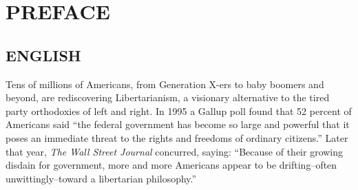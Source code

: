 \chapter*{PREFACE}
\section*{ENGLISH}
Tens of millions of Americans, from Generation X-ers to baby boomers and beyond, are rediscovering Libertarianism, a visionary alternative to the
tired party orthodoxies of left and right. In 1995 a Gallup poll found that 52 percent of Americans said ``the federal government has become so large and powerful that it poses an immediate threat to the rights and freedoms of ordinary citizens.'' Later that year, \textit{The Wall Street Journal} concurred, saying: ``Because of their growing disdain for government, more and more Americans appear to be drifting--often unwittingly--toward a libertarian philosophy.''

